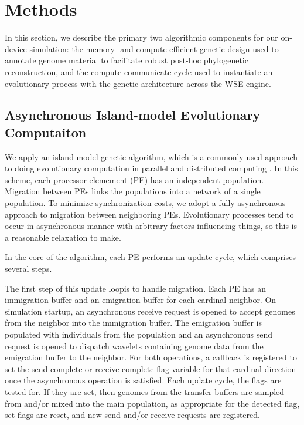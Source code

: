 \section{Methods} \label{sec:methods}

In this section, we describe the primary two algorithmic components for our on-device simulation: the memory- and compute-efficient genetic design used to annotate genome material to facilitate robust post-hoc phylogenetic reconstruction, and the compute-communicate cycle used to instantiate an evolutionary process with the genetic architecture across the WSE engine.

\subsection{Asynchronous Island-model Evolutionary Computaiton}

We apply an island-model genetic algorithm, which is a commonly used approach to doing evolutionary computation in parallel and distributed computing \citep{kozaTODO}.
In this scheme, each processor elemement (PE) has an independent population.
Migration between PEs links the populations into a network of a single population.
To minimize synchronization costs, we adopt a fully asynchronous approach to migration between neighboring PEs.
Evolutionary processes tend to occur in asynchronous manner with arbitrary factors influencing things, so this is a reasonable relaxation to make.

In the core of the algorithm, each PE performs an update cycle, which comprises several steps.

The first step of this update loopis to handle migration.
Each PE has an immigration buffer and an emigration buffer for each cardinal neighbor.
On simulation startup, an asynchronous receive request is opened to accept genomes from the neighbor into the immigration buffer.
The emigration buffer is populated with individuals from the population and an asynchronous send request is opened to dispatch wavelets containing genome data from the emigration buffer to the neighbor.
For both operations, a callback is registered to set the send complete or receive complete flag variable for that cardinal direction once the asynchronous operation is satisfied.
Each update cycle, the flags are tested for.
If they are set, then genomes from the transfer buffers are sampled from and/or mixed into the main population, as appropriate for the detected flag, set flags are reset, and new send and/or receive requests are registered.

